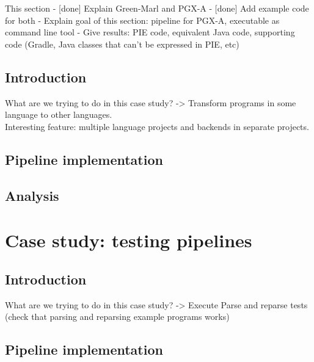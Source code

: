 This section
- [done] Explain Green-Marl and PGX-A
- [done] Add example code for both
- Explain goal of this section: pipeline for PGX-A, executable as command line tool
- Give results: PIE code, equivalent Java code, supporting code (Gradle, Java classes that can't be expressed in PIE, etc)

\subsection{Introduction}
\label{sec:evaluation__database__introduction}
What are we trying to do in this case study?
-> Transform programs in some language to other languages.
\\
Interesting feature: multiple language projects and backends in separate projects.


\subsection{Pipeline implementation}
\label{sec:evaluation__database__implementation}


\subsection{Analysis}
\label{sec:evaluation__database__analysis}


\section{Case study: testing pipelines}
\label{sec:evaluation__testing}

\subsection{Introduction}
\label{sec:evaluation__testing__introduction}
What are we trying to do in this case study?
-> Execute Parse and reparse tests (check that parsing and reparsing example programs works)


\subsection{Pipeline implementation}
\label{sec:evaluation__testing__implementation}

